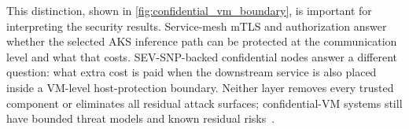 This distinction, shown in \cref{fig:confidential_vm_boundary}, is important for
interpreting the security results. Service-mesh mTLS and authorization answer whether
the selected AKS inference path can be protected at the communication level and what
that costs. SEV-SNP-backed confidential nodes answer a different question: what extra
cost is paid when the downstream service is also placed inside a VM-level
host-protection boundary. Neither layer removes every trusted component or eliminates
all residual attack surfaces; confidential-VM systems still have bounded threat models
and known residual risks~\cite{guanciale2022_confidential_quartet,schluter2024_heckler}.
